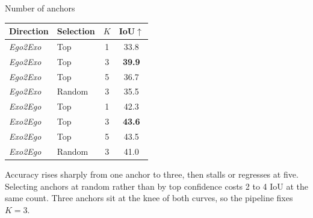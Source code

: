 \documentclass[professionalfonts,aspectratio=169]{beamer}
\begin{document}
\begin{frame}[t]
\begin{center}
{\large Number of anchors}
\end{center}
\vfill
\begin{center}
\small
\setlength{\tabcolsep}{8pt}
\begin{tabular}{llcc}
  \toprule
  Direction & Selection & $K$ & IoU$\uparrow$ \\
  \midrule
  \textit{Ego2Exo} & Top    & 1 & 33.8 \\
  \textit{Ego2Exo} & Top    & 3 & \textbf{39.9} \\
  \textit{Ego2Exo} & Top    & 5 & 36.7 \\
  \textit{Ego2Exo} & Random & 3 & 35.5 \\
  \midrule
  \textit{Exo2Ego} & Top    & 1 & 42.3 \\
  \textit{Exo2Ego} & Top    & 3 & \textbf{43.6} \\
  \textit{Exo2Ego} & Top    & 5 & 43.5 \\
  \textit{Exo2Ego} & Random & 3 & 41.0 \\
  \bottomrule
\end{tabular}
\end{center}
\vspace{0.6em}
\begin{center}
\begin{minipage}{0.88\textwidth}
\small
Accuracy rises sharply from one anchor to three, then stalls or regresses at five. Selecting anchors at random rather than by top confidence costs 2 to 4 IoU at the same count. Three anchors sit at the knee of both curves, so the pipeline fixes $K=3$.
\end{minipage}
\end{center}
\vfill
\end{frame}
\end{document}
